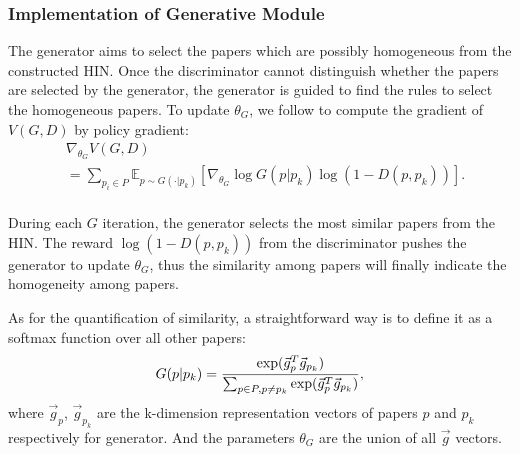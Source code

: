 \documentclass[letterpaper]{article} %
\begin{document}
\subsubsection{Implementation of Generative Module} 
The generator aims to select the papers which are possibly homogeneous from the constructed HIN.
Once the discriminator cannot distinguish whether the papers are selected by the generator, the generator is guided to find the rules to select the homogeneous papers.
To update $\theta_G$, we follow \cite{policy1} to compute the gradient of $V(G, D)$ by policy gradient:
\begin{equation}
\begin{split}
&\nabla_{\theta_G} V(G, D) \\
& =  \sum_{p_i \in P}\mathbb{E}_{p \sim G(\cdot|p_k)}[\nabla_{\theta_G}\log G(p|p_k) \log (1-D(p, p_k))].\\
\end{split}
\label{eq:Ggradient}
\end{equation}

During each $G$ iteration, the generator selects the most similar papers from the HIN. 
The reward $\log (1-D(p, p_k))$ from the discriminator pushes the generator to update $\theta_G$, thus the similarity among papers will finally indicate the homogeneity among papers.

As for the quantification of similarity, a straightforward way is to define it as a softmax function over all other papers: 
\begin{equation}
G(p|p_k)=\frac{\exp(\vec{g}_{p}^T\vec{g}_{p_k})}{\sum_{p \in P, p\neq p_k}\exp(\vec{g}_{p}^T\vec{g}_{p_k})},
\label{eq:g_softmax}
\vspace*{1pt}
\end{equation}
where $\vec{g}_{p}$, $\vec{g}_{p_k}$ are the k-dimension representation vectors of papers $p$ and $p_k$ respectively for generator. 
And the parameters $\theta_G$ are the union of all $\vec{g}$ vectors. 
\end{document}
